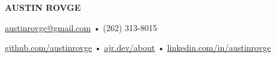 \centering\textbf{\Large AUSTIN ROVGE}

\centering\href{mailto:austinrovge@gmail.com}{austinrovge@gmail.com} • (262) 313-8015

\centering\href{https://github.com/austinrovge}{github.com/austinrovge} • \href{https://ajr.dev/about}{ajr.dev/about} • \href{https://linkedin.com/in/austinrovge}{linkedin.com/in/austinrovge}
